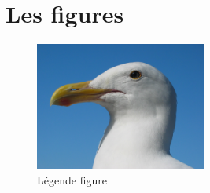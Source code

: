 \section{Les figures}


\begin{figure}[H]
	\centering
	\caption{Légende figure}
	\label{fig:label_figure}
	\includegraphics[width=0.5\textwidth]{images/gull}	
\end{figure}



